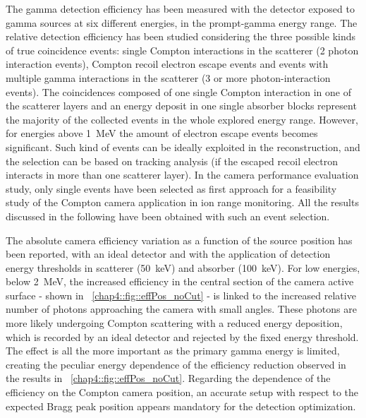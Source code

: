 The gamma detection efficiency has been measured with the detector exposed to gamma sources at six different energies, in the prompt-gamma energy range. The relative detection efficiency has been studied considering the three possible kinds of true coincidence events: single Compton interactions in the scatterer (2 photon interaction events), Compton recoil electron escape events and events with multiple gamma interactions in the scatterer (3 or more photon-interaction events). The coincidences composed of one single Compton interaction in one of the scatterer layers and an energy deposit in one single absorber blocks represent the majority of the collected events in the whole explored energy range. However, for energies above 1~MeV the amount of electron escape events becomes significant. Such kind of events can be ideally exploited in the reconstruction, and the selection can be based on tracking analysis (if the escaped recoil electron interacts in more than one scatterer layer). In the camera performance evaluation study, only single events have been selected as first approach for a feasibility study of the Compton camera application in ion range monitoring. 
All the results discussed in the following have been obtained with such an event selection.

The absolute camera efficiency variation as a function of the source position has been reported, with an ideal detector and with the application of detection energy thresholds in scatterer (50~keV) and absorber (100~keV). 
For low energies, below 2~MeV, the increased efficiency in the central section of the camera active surface - shown in \figurename~\ref{chap4::fig::effPos_noCut} - is linked to the increased relative number of photons approaching the camera with small angles. These photons are more likely undergoing Compton scattering with a reduced energy deposition, which is recorded by an ideal detector and rejected by the fixed energy threshold. The effect is all the more important as the primary gamma energy is limited, creating the peculiar energy dependence of the efficiency reduction observed in the results in \figurename~\ref{chap4::fig::effPos_noCut}.
Regarding the dependence of the efficiency on the Compton camera position, an accurate setup with respect to the expected Bragg peak position appears mandatory for the detection optimization.


